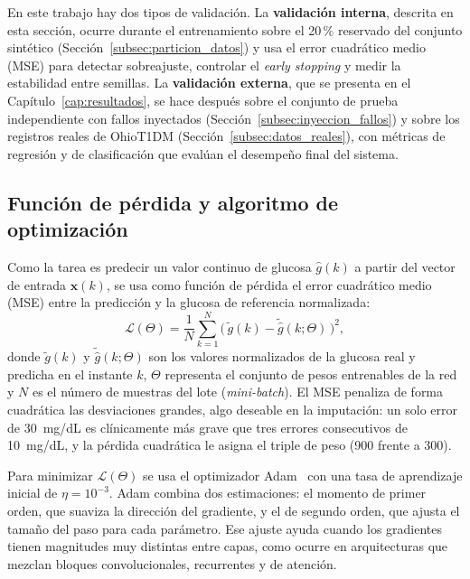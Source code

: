 \documentclass{report}
\begin{document}
En este trabajo hay dos tipos de validación. La \textbf{validación interna}, descrita en esta sección, ocurre durante el entrenamiento sobre el 20\,\% reservado del conjunto sintético (Sección~\ref{subsec:particion_datos}) y usa el error cuadrático medio (MSE) para detectar sobreajuste, controlar el \textit{early stopping} y medir la estabilidad entre semillas. La \textbf{validación externa}, que se presenta en el Capítulo~\ref{cap:resultados}, se hace después sobre el conjunto de prueba independiente con fallos inyectados (Sección~\ref{subsec:inyeccion_fallos}) y sobre los registros reales de OhioT1DM (Sección~\ref{subsec:datos_reales}), con métricas de regresión y de clasificación que evalúan el desempeño final del sistema.

\subsection{Función de pérdida y algoritmo de optimización}
\label{subsec:loss_optimizer}

Como la tarea es predecir un valor continuo de glucosa $\hat{g}(k)$ a partir del vector de entrada $\mathbf{x}(k)$, se usa como función de pérdida el error cuadrático medio (MSE) entre la predicción y la glucosa de referencia normalizada:
\begin{equation}
\label{eq:loss_mse}
\mathcal{L}(\Theta) = \frac{1}{N} \sum_{k=1}^{N} \big(\, \tilde{g}(k) - \tilde{\hat{g}}(k;\Theta) \,\big)^{2},
\end{equation}
donde $\tilde{g}(k)$ y $\tilde{\hat{g}}(k;\Theta)$ son los valores normalizados de la glucosa real y predicha en el instante $k$, $\Theta$ representa el conjunto de pesos entrenables de la red y $N$ es el número de muestras del lote (\textit{mini-batch}). El MSE penaliza de forma cuadrática las desviaciones grandes, algo deseable en la imputación: un solo error de 30~mg/dL es clínicamente más grave que tres errores consecutivos de 10~mg/dL, y la pérdida cuadrática le asigna el triple de peso (900 frente a 300).

Para minimizar $\mathcal{L}(\Theta)$ se usa el optimizador Adam~\cite{kingma2017adam} con una tasa de aprendizaje inicial de $\eta = 10^{-3}$. Adam combina dos estimaciones: el momento de primer orden, que suaviza la dirección del gradiente, y el de segundo orden, que ajusta el tamaño del paso para cada parámetro. Ese ajuste ayuda cuando los gradientes tienen magnitudes muy distintas entre capas, como ocurre en arquitecturas que mezclan bloques convolucionales, recurrentes y de atención.
\end{document}
